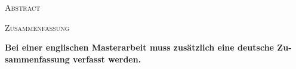 \begin{center}\large\textsc{Abstract}\end{center}
\lipsum[1]

\clearpage

\begin{otherlanguage}{ngerman}
\begin{center}\large\textsc{Zusammenfassung}\end{center}
\textbf{Bei einer englischen Masterarbeit muss zus\"atzlich eine deutsche Zusammenfassung verfasst werden.}
\lipsum[1]
\end{otherlanguage}
